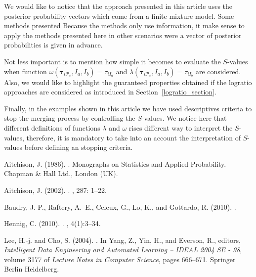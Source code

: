 \documentclass[10pt, a4paper]{article}
\newcommand{\m}[1]{\boldsymbol{#1}}
\begin{document}
\begin{spacing}{1.9}
We would like to notice that the approach presented in this article uses the posterior probability vectors which come from a finite mixture model. Some methods presented Because the methods only use information, it make sense to apply the methods presented here in other scenarios were a vector of posterior probabilities is given in advance.

Not less important is to mention how simple it becomes to evaluate the $S$-values when function $\omega(\m\tau_{i \mathcal{P}_s},  I_a,  I_b) = \tau_{iI_a}$ and $\lambda(\m\tau_{i \mathcal{P}_s},  I_a,  I_b) = \tau_{iI_b}$ are considered. Also, we would like to highlight the guaranteed properties obtained if the logratio approaches are considered as introduced in Section~\ref{logratio_section}.

Finally, in the examples shown in this article we have used descriptives criteria to stop the merging process by controlling the $S$-values. We notice here that different definitions of functions $\lambda$ and $\omega$ rises different way to interpret the $S$-values, therefore, it is mandatory to take into an account the interpretation of $S$-values before defining an stopping criteria.


\newpage


\begin{thebibliography}{}

Aitchison, J. (1986).
.
\newblock Monographs on Statistics and Applied Probability. Chapman \& Hall
  Ltd., London (UK).

Aitchison, J. (2002).
.
, 287: 1--22.

Baudry, J.-P., Raftery, A.~E., Celeux, G., Lo, K., and Gottardo, R. (2010).
.

Hennig, C. (2010).
.
, 4(1):3--34.

Lee, H.-j. and Cho, S. (2004).
.
\newblock In Yang, Z., Yin, H., and Everson, R., editors, {\em Intelligent Data
  Engineering and Automated Learning – IDEAL 2004 SE - 98}, volume 3177 of
  {\em Lecture Notes in Computer Science}, pages 666--671. Springer Berlin
  Heidelberg.


\end{thebibliography}
\end{spacing}
\end{document}
